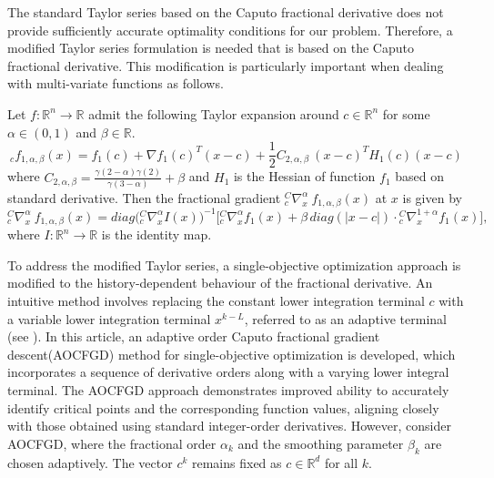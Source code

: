 \documentclass[smallextended,referee,envcountsect]{svjour3}
\begin{document}
The standard Taylor series based on the Caputo fractional derivative does not provide sufficiently accurate optimality conditions for our problem. Therefore, a modified Taylor series formulation is needed that is based on the Caputo fractional derivative. This modification is particularly important when dealing with multi-variate functions as follows.
\begin{lemma}\cite{72}\label{thm1}
Let $ f: \mathbb{R}^n\rightarrow \mathbb{R} $ admit the following Taylor expansion around $c\in\mathbb{R}^n$ for some $ \alpha \in (0,1) $ and $ \beta \in \mathbb{R} $. %
\[
{}_cf_{1,\alpha,\beta}(x) = f_1(c) + \nabla f_1(c)^T (x - c) + \frac{1}{2} C_{2,\alpha,\beta}~ (x-c)^T H_1(c)(x - c)
\]
where $C_{2,\alpha,\beta} = \frac{\gamma(2-\alpha)\gamma(2)}{\gamma(3-\alpha)} + \beta $ and $H_1$ is  the Hessian of function $f_1$ based on standard derivative. Then the fractional gradient $ {}^C_c\nabla^{\alpha}_x~{}f_{1,\alpha,\beta}(x) $ at $ x $ is given by
\[
{}^C_c\nabla^{\alpha}_x~{}f_{1,\alpha,\beta}(x) 
= diag\Big({}^C_c\nabla^{\alpha}_x I(x)\Big)^{-1}
\Big[ {}^C_c\nabla^{\alpha}_x f_1(x) + \beta\, diag(|x - c|)\cdot {}^C_c\nabla^{1+\alpha}_x f_1(x)\Big],
\]
where $ I : \mathbb{R}^n \to \mathbb{R} $ is the identity map.
\end{lemma}
To address the modified Taylor series, a single-objective optimization approach is modified to the history-dependent behaviour of the fractional derivative. An intuitive method involves replacing the constant lower integration terminal $c$ with a variable lower integration terminal $x^{k-L}$, referred to as an adaptive terminal (see \cite{50}). In this article, an adaptive order Caputo fractional gradient descent(AOCFGD) method for single-objective optimization is developed, which incorporates a sequence of derivative orders along with a varying lower integral terminal. The AOCFGD approach demonstrates improved ability to accurately identify critical points and the corresponding function values, aligning closely with those obtained using standard integer-order derivatives. 
 However, consider AOCFGD, where the fractional order $\alpha_k$ and the smoothing parameter $\beta_k$ are chosen adaptively. The vector $c^k$ remains fixed as $c \in \mathbb{R}^d$ for all $k$.
\end{document}
